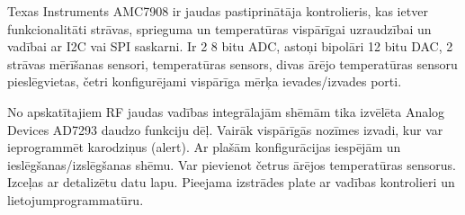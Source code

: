 Texas Instruments AMC7908\cite{amc7908} ir jaudas pastiprinātāja kontrolieris, kas ietver funkcionalitāti strāvas, sprieguma un temperatūras vispārīgai uzraudzībai un vadībai ar I2C vai SPI saskarni. Ir 2 8 bitu ADC, astoņi bipolāri 12 bitu DAC, 2 strāvas mērīšanas sensori, temperatūras sensors, divas ārējo temperatūras sensoru pieslēgvietas, četri konfigurējami vispārīga mērķa ievades/izvades porti.

No apskatītajiem RF jaudas vadības integrālajām shēmām tika  izvēlēta Analog Devices AD7293 daudzo funkciju dēļ. Vairāk vispārīgās nozīmes izvadi, kur var ieprogrammēt karodziņus (alert). Ar plašām konfigurācijas iespējām un ieslēgšanas/izslēgšanas shēmu. Var pievienot četrus ārējos temperatūras sensorus. Izceļas ar detalizētu datu lapu. Pieejama izstrādes plate ar vadības kontrolieri un lietojumprogrammatūru.